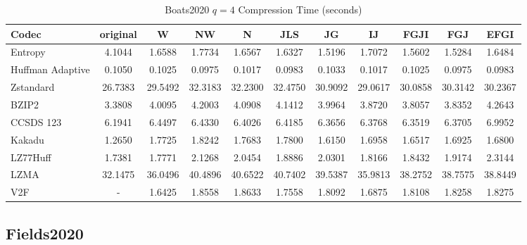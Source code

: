 \documentclass{article}
\begin{document}
\begin{table}[h!]
\centering
\caption{Boats2020 $q=4$ Compression Time (seconds)}
\begin{tabular}{|l|cccccccccc|}
\hline
Codec &  original &       W &      NW &       N &     JLS &      JG &      IJ &    FGJI &     FGJ &    EFGI \\
\hline
Entropy & 4.1044 & 1.6588 & 1.7734 & 1.6567 & 1.6327 & 1.5196 & 1.7072 & 1.5602 & 1.5284 & 1.6484         \\
\hline
Huffman Adaptive &    0.1050 &  0.1025 &  0.0975 &  0.1017 &  0.0983 &  0.1033 &  0.1017 &  0.1025 &  0.0975 &  0.0983 \\
Zstandard        &   26.7383 & 29.5492 & 32.3183 & 32.2300 & 32.4750 & 30.9092 & 29.0617 & 30.0858 & 30.3142 & 30.2367 \\
BZIP2            &    3.3808 &  4.0095 &  4.2003 &  4.0908 &  4.1412 &  3.9964 &  3.8720 &  3.8057 &  3.8352 &  4.2643 \\
CCSDS 123        &    6.1941 &  6.4497 &  6.4330 &  6.4026 &  6.4185 &  6.3656 &  6.3768 &  6.3519 &  6.3705 &  6.9952 \\
Kakadu           &    1.2650 &  1.7725 &  1.8242 &  1.7683 &  1.7800 &  1.6150 &  1.6958 &  1.6517 &  1.6925 &  1.6800 \\
LZ77Huff         &    1.7381 &  1.7771 &  2.1268 &  2.0454 &  1.8886 &  2.0301 &  1.8166 &  1.8432 &  1.9174 &  2.3144 \\
LZMA             &   32.1475 & 36.0496 & 40.4896 & 40.6522 & 40.7402 & 39.5387 & 35.9813 & 38.2752 & 38.7575 & 38.8449 \\
V2F              &    - &  1.6425 &  1.8558 &  1.8633 &  1.7558 &  1.8092 &  1.6875 &  1.8108 &  1.8258 &  1.8275 \\
\hline
\end{tabular}
\end{table}

\newpage
\subsection{Fields2020}
\end{document}

